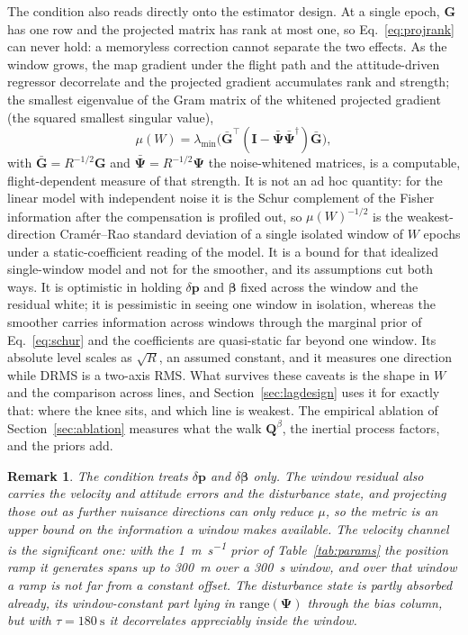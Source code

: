 \documentclass{IEEEtaes}
\newtheorem{remark}{Remark}
\begin{document}
The condition also reads directly onto the estimator design. At a single
epoch, $\mathbf{G}$ has one row and the projected matrix has rank at most one,
so Eq.~\eqref{eq:projrank} can never hold: a memoryless correction cannot
separate the two effects. As the window grows, the map gradient under the
flight path and the attitude-driven regressor decorrelate and the projected
gradient accumulates rank and strength; the smallest eigenvalue of the Gram
matrix of the whitened projected gradient (the squared smallest singular
value),
\begin{equation}
\mu(W)=\lambda_{\min}\!\Big(\bar{\mathbf{G}}^{\top}
(\mathbf{I}-\bar{\boldsymbol{\Psi}}\bar{\boldsymbol{\Psi}}^{\dagger})
\bar{\mathbf{G}}\Big),
\label{eq:mu}
\end{equation}
with $\bar{\mathbf{G}}=R^{-1/2}\mathbf{G}$ and
$\bar{\boldsymbol{\Psi}}=R^{-1/2}\boldsymbol{\Psi}$ the noise-whitened
matrices, is a computable, flight-dependent measure of that strength. It is
not an ad hoc quantity: for the linear model with independent noise it is
the Schur complement of the Fisher information after the compensation is
profiled out, so $\mu(W)^{-1/2}$ is the weakest-direction Cram\'er--Rao
standard deviation of a single isolated window of $W$ epochs under a
static-coefficient reading of the model. It is a bound for that idealized single-window model and not for the
smoother, and its assumptions cut both ways. It is optimistic in holding $\delta\mathbf{p}$
and $\boldsymbol{\beta}$ fixed across the window and the residual white; it
is pessimistic in seeing one window in isolation, whereas the smoother
carries information across windows through the marginal prior of
Eq.~\eqref{eq:schur} and the coefficients are quasi-static far beyond one
window. Its absolute level scales as $\sqrt{R}$, an assumed constant, and it
measures one direction while DRMS is a two-axis RMS. What survives these
caveats is the shape in $W$ and the comparison across lines, and
Section~\ref{sec:lagdesign} uses it for exactly that: where the knee sits,
and which line is weakest. The empirical ablation of
Section~\ref{sec:ablation} measures what the walk $\mathbf{Q}^{\beta}$, the
inertial process factors, and the priors add.

\begin{remark}\label{rem:nuisance}
The condition treats $\delta\mathbf{p}$ and $\delta\boldsymbol{\beta}$ only.
The window residual also carries the velocity and attitude errors and the
disturbance state, and projecting those out as further nuisance directions
can only reduce $\mu$, so the metric is an upper bound on the information a
window makes available. The velocity channel is the significant one: with the
\SI{1}{\meter\per\second} prior of Table~\ref{tab:params} the position ramp
it generates spans up to \SI{300}{\meter} over a \SI{300}{\second} window,
and over that window a ramp is not far from a constant offset. The
disturbance state is partly absorbed already, its window-constant part lying
in $\mathrm{range}(\boldsymbol{\Psi})$ through the bias column, but with
$\tau=\SI{180}{\second}$ it decorrelates appreciably inside the window.
\end{remark}
\end{document}
